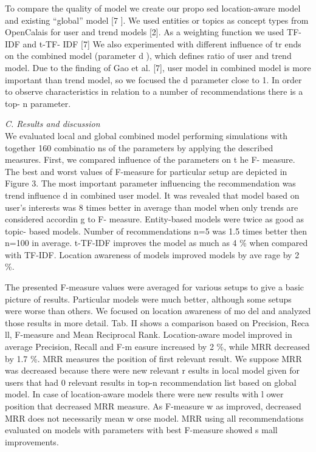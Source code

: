 \documentclass[conference]{IEEEtran}
\begin{document}
To compare the quality of model we create our propo
sed 
location-aware model and existing “global” model [7
]. 
We   used   entities   or   topics   as   concept   types   from 
OpenCalais for user and trend models [2].  
As  a  weighting  function  we  used  TF-IDF  and  t-TF-
IDF [7] We  also  experimented  with  different  influence  of  tr
ends 
on the combined model (parameter 
d
), which defines ratio of 
user  and  trend  model.  Due  to  the  finding  of  Gao  et 
al.  [7], 
user model in combined model is more important than
 trend 
model, so we focused the 
d 
parameter close to 1. 
In order to observe characteristics in relation to 
a number 
of recommendations there is a top-
n
 parameter.

\textit{C.    Results and discussion}\\
We    evaluated    local    and    global    combined    model 
performing  simulations  with  together  160  combinatio
ns  of 
the parameters by applying the described measures. 
First, we compared influence of the parameters on t
he F-
measure.   The   best   and   worst   values   of   F-measure   for
particular setup are depicted in Figure 3. The most
 important 
parameter    influencing    the    recommendation    was    trend 
influence 
d
  in  combined  user  model.  It  was  revealed  that 
model based on user’s interests was 8 times better 
in average 
than model when only trends are considered accordin
g to F-
measure.  Entity-based  models  were  twice  as  good  as 
topic-
based  models.  Number  of  recommendations 
n=5
  was  1.5 
times  better  then 
n=100
  in  average.  t-TF-IDF  improves  the 
model   as   much   as   4   \%   when   compared   with  TF-IDF. 
Location  awareness  of  models  improved  models  by  ave
rage 
by 2 \%.

The   presented   F-measure   values   were   averaged   for 
various  setups  to  give  a  basic  picture  of  results. 
Particular 
models  were  much  better, although  some  setups  were 
worse 
than others. We focused on location awareness of mo
del and 
analyzed those results in more detail.  
Tab.  II  shows  a  comparison  based  on  Precision,  Reca
ll, 
F-measure   and   Mean   Reciprocal   Rank.   Location-aware 
model improved in average Precision, Recall and F-m
easure 
increased  by  2  \%,  while  MRR  decreased  by  1.7  \%.  MRR
measures  the  position  of  first  relevant  result.  We 
suppose 
MRR was decreased because there were new relevant r
esults 
in  local  model  given  for  users  that  had  0  relevant 
results  in 
top-n recommendation list based on global model. In
 case of location-aware  models  there  were  new  results  with  l
ower 
position  that  decreased  MRR  measure.  As  F-measure  w
as 
improved, decreased  MRR  does  not  necessarily  mean  w
orse 
model.   MRR   using   all   recommendations   evaluated   on 
models  with  parameters  with  best  F-measure  showed  s
mall 
improvements. \\
\end{document}
